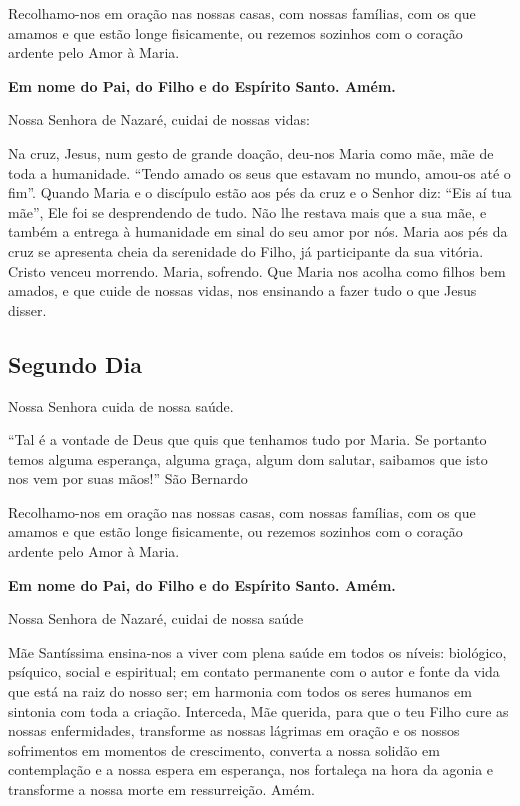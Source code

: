 \documentclass[a4paper,14pt]{extarticle} \usepackage[utf8]{inputenc}
\begin{document}
Recolhamo-nos em oração nas nossas casas, com nossas famílias, com os que amamos e que estão longe fisicamente, ou rezemos sozinhos com o coração ardente pelo Amor à Maria.

\textbf{Em nome do Pai, do Filho e do Espírito Santo. Amém.}

Nossa Senhora de Nazaré, cuidai de nossas vidas:

Na cruz, Jesus, num gesto de grande doação, deu-nos Maria como mãe, mãe de toda a humanidade. “Tendo amado os seus que estavam no mundo, amou-os até o fim”. Quando Maria e o discípulo estão aos pés da cruz e o Senhor diz: “Eis aí tua mãe”, Ele foi se desprendendo de tudo. Não lhe restava mais que a sua mãe, e também a entrega à humanidade em sinal do seu amor por nós. Maria aos pés da cruz se apresenta cheia da serenidade do Filho, já participante da sua vitória. Cristo venceu morrendo. Maria, sofrendo. Que Maria nos acolha como filhos bem amados, e que cuide de nossas vidas, nos ensinando a fazer tudo o que Jesus disser.

\textbf{}

\subsection{Segundo Dia}

\textbf{}

Nossa Senhora cuida de nossa saúde.

“Tal é a vontade de Deus que quis que tenhamos tudo por Maria. Se portanto temos alguma esperança, alguma graça, algum dom salutar, saibamos que isto nos vem por suas mãos!” São Bernardo

Recolhamo-nos em oração nas nossas casas, com nossas famílias, com os que amamos e que estão longe fisicamente, ou rezemos sozinhos com o coração ardente pelo Amor à Maria.

\textbf{Em nome do Pai, do Filho e do Espírito Santo. Amém.}

Nossa Senhora de Nazaré, cuidai de nossa saúde

Mãe Santíssima ensina-nos a viver com plena saúde em todos os níveis: biológico, psíquico, social e espiritual; em contato permanente com o autor e fonte da vida que está na raiz do nosso ser; em harmonia com todos os seres humanos em sintonia com toda a criação. Interceda, Mãe querida, para que o teu Filho cure as nossas enfermidades, transforme as nossas lágrimas em oração e os nossos sofrimentos em momentos de crescimento, converta a nossa solidão em contemplação e a nossa espera em esperança, nos fortaleça na hora da agonia e transforme a nossa morte em ressurreição. Amém.
\end{document}
